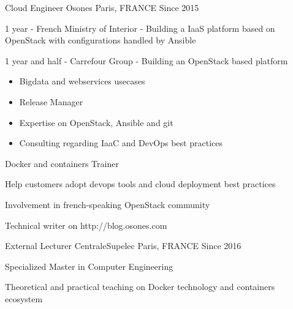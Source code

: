 

\begin{cventries}

  \cventry
    {Cloud Engineer} %
    {Osones} %
    {Paris, FRANCE} %
    {Since 2015} %
    {
      \begin{cvitems} %
        \item {1 year - French Ministry of Interior - Building a IaaS
          platform based on OpenStack with configurations handled by Ansible}
        \item {1 year and half - Carrefour Group - Building an OpenStack based platform}
          \begin{itemize}
          \item {Bigdata and webservices usecases}
          \item {Release Manager}
          \item {Expertise on OpenStack, Ansible and git}
          \item {Consulting regarding IaaC and DevOps best practices}
          \end{itemize}
      \item {Docker and containers Trainer}
      \item {Help customers adopt devops tools and cloud deployment best
        practices}
      \item {Involvement in french-speaking OpenStack community}
      \item {Technical writer on http://blog.osones.com}
      \end{cvitems}
    }

  \cventry
    {External Lecturer} %
    {CentraleSupelec}
    {Paris, FRANCE} %
    {Since 2016} %
    {
      \begin{cvitems} %
        \item {Specialized Master in Computer Engineering}
        \item {Theoretical and practical teaching on Docker technology and
          containers ecosystem}
      \end{cvitems}
    }


\end{cventries}
